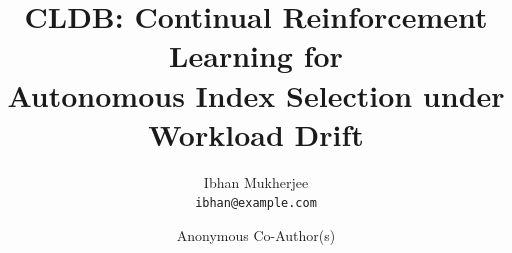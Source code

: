 \documentclass[10pt,twocolumn]{article}
\title{\vspace{-1.2em}\textbf{CLDB: Continual Reinforcement Learning for\\
Autonomous Index Selection under Workload Drift}\vspace{-0.4em}}
\author{
Ibhan Mukherjee\\
\texttt{ibhan@example.com}
\and
Anonymous Co-Author(s)
}
\date{}
\begin{document}
\maketitle

\begin{abstract}

\end{abstract}











\balance


\end{document}
